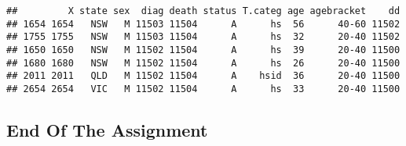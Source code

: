 \documentclass[
]{article}
\newenvironment{Shaded}{\begin{snugshade}}{\end{snugshade}}
\newcommand{\DecValTok}[1]{\textcolor[rgb]{0.00,0.00,0.81}{#1}}
\newcommand{\KeywordTok}[1]{\textcolor[rgb]{0.13,0.29,0.53}{\textbf{#1}}}
\newcommand{\NormalTok}[1]{#1}
\newcommand{\OperatorTok}[1]{\textcolor[rgb]{0.81,0.36,0.00}{\textbf{#1}}}
\begin{document}
\begin{Shaded}
\end{Shaded}

\begin{verbatim}
##         X state sex  diag death status T.categ age agebracket    dd
## 1654 1654   NSW   M 11503 11504      A      hs  56      40-60 11502
## 1755 1755   NSW   M 11503 11504      A      hs  32      20-40 11502
## 1650 1650   NSW   M 11502 11504      A      hs  39      20-40 11500
## 1680 1680   NSW   M 11502 11504      A      hs  26      20-40 11500
## 2011 2011   QLD   M 11502 11504      A    hsid  36      20-40 11500
## 2654 2654   VIC   M 11502 11504      A      hs  33      20-40 11500
\end{verbatim}

\hypertarget{end-of-the-assignment}{%
\subsection{End Of The Assignment}\label{end-of-the-assignment}}
\end{document}
